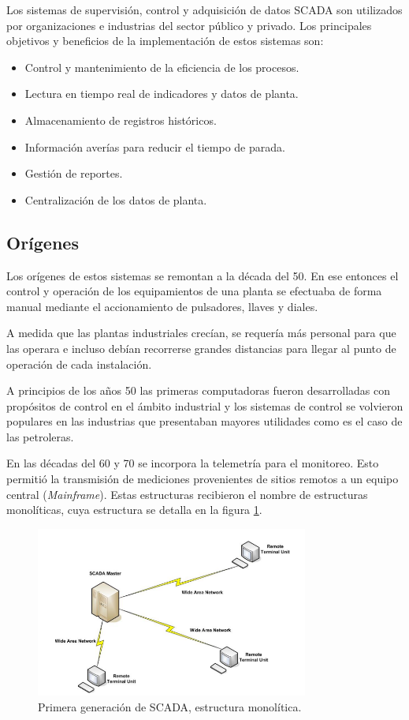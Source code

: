 Los sistemas de supervisión, control y adquisición de datos SCADA son utilizados por organizaciones e industrias del sector público y privado.
Los principales objetivos y beneficios de la implementación de estos sistemas son: 

\begin{itemize}
	\item Control y mantenimiento de la eficiencia de los procesos.
	\item Lectura en tiempo real de indicadores y datos de planta.
	\item Almacenamiento de registros históricos.
	\item Información averías para reducir el tiempo de parada. 
	\item Gestión de reportes.
	\item Centralización de los datos de planta.
\end{itemize}

\subsection{Orígenes}

Los orígenes de estos sistemas se remontan a la década del 50. En ese entonces el control y operación de los equipamientos de una planta se efectuaba de forma manual mediante el accionamiento de pulsadores, llaves y diales.

A medida que las plantas industriales crecían, se requería más personal para que las operara e incluso debían recorrerse grandes distancias para llegar al punto de operación de cada instalación.

A principios de los años 50 las primeras computadoras fueron desarrolladas con propósitos de control en el ámbito industrial y los sistemas de control se volvieron populares en las industrias que presentaban mayores utilidades como es el caso de las petroleras.

En las décadas del 60 y 70 se incorpora la telemetría para el monitoreo. Esto permitió la transmisión de mediciones provenientes de sitios remotos a un equipo central (\textit{Mainframe})\citep{ARTICLE1}. Estas estructuras recibieron el nombre de estructuras monolíticas, cuya estructura se detalla en la figura \ref{fig:SCMON}.

\begin{figure}[htbp]
	\centering
	\includegraphics[width=0.8\textwidth]{./Figures/SCADA_MONOLITICO.png }
	\caption{Primera generación de SCADA, estructura monolítica.\citep{BOOK:2}}
	\label{fig:SCMON}
\end{figure}

